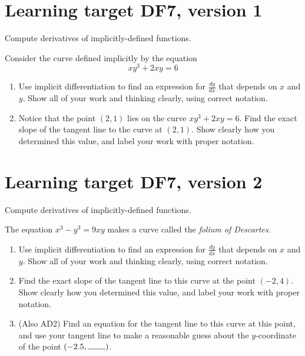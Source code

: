 
\usepackage{pgfplots}


%


\allowdisplaybreaks

\section{Learning target DF7, version 1}

Compute derivatives of implicitly-defined functions.

\hrulefill

Consider the curve defined implicitly by the equation
	$$xy^3 + 2xy = 6$$
	
	\begin{enumerate}[leftmargin=15pt]
	
		\item Use implicit differentiation to find an expression for $\frac{dy}{dx}$ that depends on $x$ and $y$.  Show all of your work and thinking clearly, using correct notation.

		\vfill
	
		
		\item Notice that the point $(2,1)$ lies on the curve $xy^3 + 2xy = 6$.  Find the exact slope of the tangent line to the curve at $(2,1)$.  Show clearly how you determined this value, and label your work with proper notation.
		
		\vfill
	
	\end{enumerate}

\pagebreak

\section{Learning target DF7, version 2}

Compute derivatives of implicitly-defined functions.

\hrulefill

The equation \(x^{3}-y^{3}=9xy\) makes a curve called the \textit{folium of Descartes}.

\begin{enumerate}
	\item Use implicit differentiation to find an expression for $\frac{dy}{dx}$ that depends on $x$ and $y$.  Show all of your work and thinking clearly, using correct notation.

	\vfill

	\item Find the exact slope of the tangent line to this curve at the point \((-2, 4)\). Show clearly how you determined this value, and label your work with proper notation.

	\vfill

	\item (Also AD2) Find an equation for the tangent line to this curve at this point, and use your tangent line to make a reasonable guess about the $y$-coordinate of the point $(-2.5, \rule{0.75cm}{0.15mm} )$.
	\vspace{1in}
\end{enumerate}

